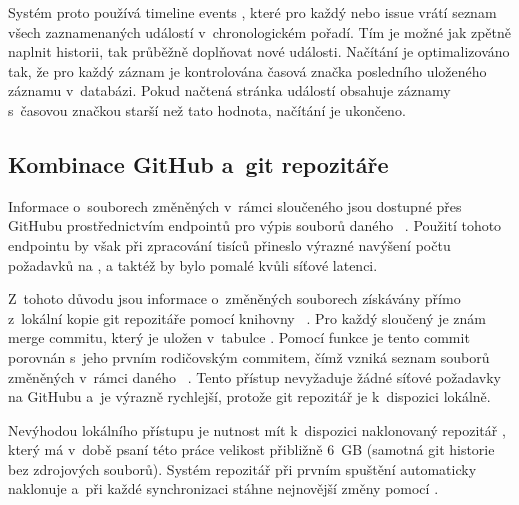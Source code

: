 Systém proto používá timeline events \API, které pro každý \PR nebo issue vrátí seznam všech zaznamenaných událostí v~chronologickém pořadí. Tím je možné jak zpětně naplnit historii, tak průběžně doplňovat nové události. Načítání je optimalizováno tak, že pro každý záznam je kontrolována časová značka posledního uloženého záznamu v~databázi.  Pokud načtená stránka událostí obsahuje záznamy s~časovou značkou starší než tato hodnota, načítání je ukončeno.

\subsection{Kombinace GitHub \API a~git repozitáře}
\label{subsec:implementation:gotchas:api_vs_git}

Informace o~souborech změněných v~rámci sloučeného \PR jsou dostupné přes \API GitHubu prostřednictvím endpointů pro výpis souborů daného \PR~\cite{github_rest_api}. Použití tohoto endpointu by však při zpracování tisíců \PR přineslo výrazné navýšení počtu požadavků na \API, a taktéž by bylo pomalé kvůli síťové latenci.

Z~tohoto důvodu jsou informace o~změněných souborech získávány přímo z~lokální kopie git repozitáře pomocí knihovny ~\cite{rust_git2_diff}. Pro každý sloučený \PR je znám \SHA merge commitu, který je uložen v~tabulce . Pomocí funkce  je tento commit porovnán s~jeho prvním rodičovským commitem, čímž vzniká seznam souborů změněných v~rámci daného \PR~\cite{chacon2014progit,rust_git2_diff}. Tento přístup nevyžaduje žádné síťové požadavky na \API GitHubu a~je výrazně rychlejší, protože git repozitář je k~dispozici lokálně.

Nevýhodou lokálního přístupu je nutnost mít k~dispozici naklonovaný repozitář , který má v~době psaní této práce velikost přibližně 6~GB (samotná git historie bez zdrojových souborů). Systém repozitář při prvním spuštění automaticky naklonuje a~při každé synchronizaci stáhne nejnovější změny pomocí .
